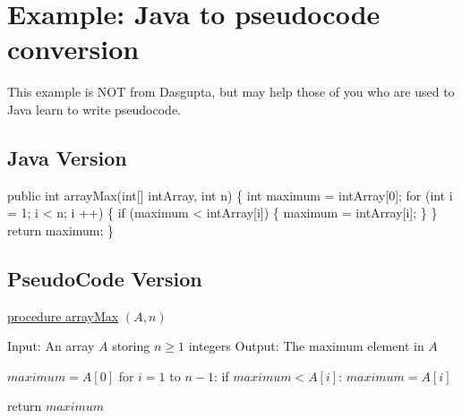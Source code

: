 \documentclass[11pt]{article}			%
\begin{document}
\section*{Example: Java to pseudocode conversion}

This example is NOT from Dasgupta, but may help those of you who are used to Java learn to write pseudocode.

\subsection*{Java Version}

\begin{pseudo}
public int arrayMax(int[] intArray, int n) \{
	int maximum = intArray[0];
	for (int i = 1; i < n; i ++) \{
		if (maximum < intArray[i]) \{
			maximum = intArray[i];
		\}
	\}
	return maximum;
\}
\end{pseudo}

\subsection*{PseudoCode Version}

\begin{pseudo}
\underline{procedure arrayMax} $(A, n)$

Input: An array $A$ storing $n \geq 1$ integers
Output: The maximum element in $A$

$maximum = A[0]$
for $i = 1$ to $n-1$:
	if $maximum < A[i]$: $maximum = A[i]$

return $maximum$
\end{pseudo}
\end{document}
